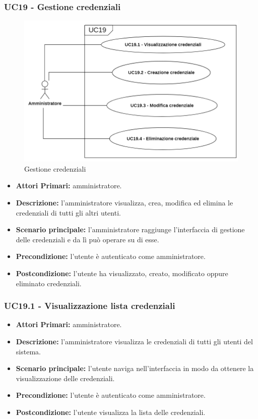 \subsubsection{ UC19 - Gestione credenziali}
\begin{figure}[H]
	\centering
	\includegraphics[width=15cm]{res/images/UC19.png}
	\caption{Gestione credenziali}
	\label{fig:Gestione credenziali}
\end{figure}
\begin{itemize}
           	\item\textbf{Attori Primari:}
           	amministratore.
           	\item\textbf{Descrizione:} 
           	l'amministratore visualizza, crea, modifica ed elimina le credenziali di tutti gli altri utenti.
           	\item\textbf{Scenario principale:} 
           	l'amministratore raggiunge l'interfaccia di gestione delle credenziali e da lì può operare su di esse.
           	\item\textbf{Precondizione:} 
           	l'utente è autenticato come amministratore.
           	\item\textbf{Postcondizione:}
           	l'utente ha visualizzato, creato, modificato oppure eliminato credenziali.
\end{itemize}

\subsubsection{ UC19.1 - Visualizzazione lista credenziali}
\begin{itemize}
	\item\textbf{Attori Primari:} 
	amministratore.
	\item\textbf{Descrizione:} 
	l'amministratore visualizza le credenziali di tutti gli utenti del sistema.
	\item\textbf{Scenario principale:} 
	l'utente naviga nell'interfaccia in modo da ottenere la visualizzazione delle credenziali.
	\item\textbf{Precondizione:} 
	l'utente è autenticato come amministratore.
	\item\textbf{Postcondizione:}
	l'utente visualizza la lista delle credenziali.
\end{itemize}

